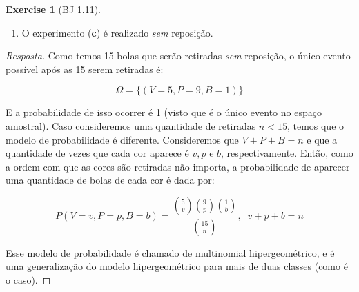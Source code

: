 \documentclass[
]{article}
\providecommand{\tightlist}{%
  \setlength{\itemsep}{0pt}\setlength{\parskip}{0pt}}
\theoremstyle{definition}
\theoremstyle{definition}
\theoremstyle{definition}
\newtheorem{exercise}{Exercise}[section]
\theoremstyle{definition}
\theoremstyle{remark}
\begin{document}
\begin{exercise}[BJ 1.11]
\begin{enumerate}
\def\labelenumi{\alph{enumi})}
\setcounter{enumi}{3}
\tightlist
\item
  O experimento (\textbf{c}) é realizado \emph{sem} reposição.
\end{enumerate}

\begin{proof}[Resposta]
Como temos 15 bolas que serão retiradas \emph{sem} reposição, o único evento possível após as 15 serem retiradas é:

\begin{equation*}
\Omega = \{(V=5,P=9,B=1)\}
\end{equation*}

E a probabilidade de isso ocorrer é 1 (visto que é o único evento no espaço amostral). Caso consideremos uma quantidade de retiradas \(n < 15\), temos que o modelo de probabilidade é diferente. Consideremos que \(V + P + B = n\) e que a quantidade de vezes que cada cor aparece é \(v,p\) e \(b\), respectivamente. Então, como a ordem com que as cores são retiradas não importa, a probabilidade de aparecer uma quantidade de bolas de cada cor é dada por:

\begin{equation*}
P(V=v,P=p,B=b) = \frac{\binom{5}{v}\binom{9}{p}\binom{1}{b}}{\binom{15}{n}}, \;\; v+p+b = n
\end{equation*}

Esse modelo de probabilidade é chamado de multinomial hipergeométrico, e é uma generalização do modelo hipergeométrico para mais de duas classes (como é o caso).
\end{proof}

\end{exercise}
\end{document}
